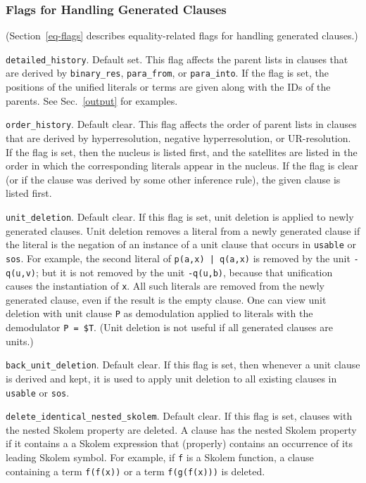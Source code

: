 \documentclass[11pt]{article}
\begin{document}
\subsubsection{Flags for Handling Generated Clauses} \label{gen-flags}

(Section~\ref{eq-flags} describes equality-related flags for handling
generated clauses.)

\noindent
\verb:detailed_history:.  Default set.  This flag affects the
parent lists in clauses that are derived by \verb:binary_res:,
\verb:para_from:, or \verb:para_into:.  If the flag is set,
the positions of the unified literals or terms are given
along with the IDs of the parents.  See Sec.~\ref{output}
for examples.

\noindent
\verb:order_history:.  Default clear.  This flag affects the
order of parent lists in clauses that are derived by hyperresolution,
negative hyperresolution, or UR-resolution.  If the flag is set, then
the nucleus is listed first, and the satellites are listed in the order
in which the corresponding literals appear in the nucleus.  If the flag
is clear (or if the clause was derived by some other inference rule),
the given clause is listed first.

\noindent
\verb:unit_deletion:.  Default clear.
If this flag is set, unit deletion is applied to newly generated clauses.
Unit deletion removes a literal from a newly
generated clause if the literal is the negation of an instance of a
unit clause that occurs in \verb:usable: or \verb:sos:.
For example, the second literal of \verb:p(a,x) | q(a,x): is removed by
the unit \verb:-q(u,v):; but it is not removed by the unit \verb:-q(u,b):,
because that unification causes the instantiation of \verb:x:.
All such literals are removed from the newly generated clause, even if
the result is the empty clause.
One can view unit deletion with unit clause \verb:P: as demodulation
applied to literals with the demodulator \verb:P = $T:.
(Unit deletion is not useful if all generated clauses are units.)

\noindent
\verb:back_unit_deletion:.  Default clear.
If this flag is set, then whenever a unit clause is derived
and kept, it is used to apply unit deletion to all existing
clauses in \verb:usable: or \verb:sos:.

\noindent
\verb:delete_identical_nested_skolem:.  Default clear.  If this
flag is set, clauses with the nested Skolem property are deleted.
A clause has the nested Skolem property if it contains a
a Skolem expression that (properly) contains
an occurrence of its leading Skolem symbol.  For example, if \verb:f:
is a Skolem function, a clause containing a term \verb:f(f(x)):
or a term \verb:f(g(f(x))): is deleted.
\end{document}
